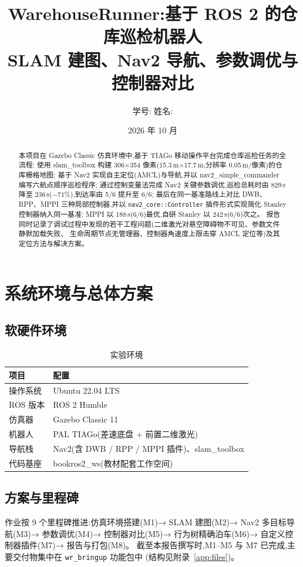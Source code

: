 \documentclass[12pt, a4paper]{ctexart}
\title{\textbf{WarehouseRunner:基于 ROS 2 的仓库巡检机器人}\\[0.3em]
\large SLAM 建图、Nav2 导航、参数调优与控制器对比}
\author{学号:\underline{\hspace{3em}} \quad 姓名:\underline{\hspace{3em}}}
\date{2026 年 10 月}
\begin{document}
\maketitle

\begin{abstract}
本项目在 Gazebo Classic 仿真环境中,基于 TIAGo 移动操作平台完成仓库巡检任务的全流程:
使用 slam\_toolbox 构建 306$\times$354 像素(15.3\,m$\times$17.7\,m,分辨率 0.05\,m/像素)的仓库栅格地图;
基于 Nav2 实现自主定位(AMCL)与导航,并以 nav2\_simple\_commander 编写六航点顺序巡检程序;
通过控制变量法完成 Nav2 关键参数调优,巡检总耗时由 829\,s 降至 236\,s($-71\%$),到达率由 5/6 提升至 6/6;
最后在同一基准路线上对比 DWB、RPP、MPPI 三种局部控制器,并以 \texttt{nav2\_core::Controller} 插件形式实现简化 Stanley 控制器纳入同一基准:
MPPI 以 188\,s(6/6)最优,自研 Stanley 以 242\,s(6/6)次之。
报告同时记录了调试过程中发现的若干工程问题(二维激光对悬空障碍物不可见、参数文件静默加载失败、
生命周期节点无管理器、控制器角速度上限击穿 AMCL 定位等)及其定位方法与解决方案。
\end{abstract}

\tableofcontents
\newpage

\section{系统环境与总体方案}

\subsection{软硬件环境}
\begin{table}[H]
\centering
\begin{tabular}{ll}
\toprule
项目 & 配置 \\
\midrule
操作系统 & Ubuntu 22.04 LTS \\
ROS 版本 & ROS 2 Humble \\
仿真器 & Gazebo Classic 11 \\
机器人 & PAL TIAGo(差速底盘 + 前置二维激光) \\
导航栈 & Nav2(含 DWB / RPP / MPPI 插件)、slam\_toolbox \\
代码基座 & bookros2\_ws(教材配套工作空间) \\
\hline
\end{tabular}
\caption{实验环境}
\end{table}

\subsection{方案与里程碑}
作业按 9 个里程碑推进:仿真环境搭建(M1)→ SLAM 建图(M2)→ Nav2 多目标导航(M3)→
参数调优(M4)→ 控制器对比(M5)→ 行为树精确泊车(M6)→ 自定义控制器插件(M7)→ 报告与打包(M8)。
截至本报告撰写时,M1--M5 与 M7 已完成,主要交付物集中在 \texttt{wr\_bringup} 功能包中
(结构见附录~\ref{app:files})。
\end{document}
